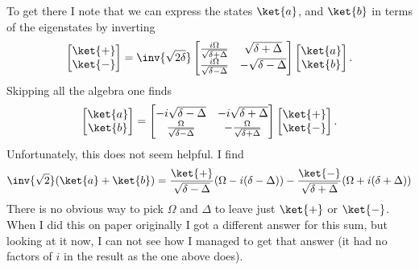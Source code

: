 {To get there I note that we can express the states \(\ket{a}\), and \(\ket{b}\) in terms of the eigenstates by inverting
%
\begin{equation}\label{eqn:qmIexamPractice2008Dec:2:150}
\begin{bmatrix}
\ket{+} \\
\ket{-} \\
\end{bmatrix}
=\inv{\sqrt{2\delta}}
\begin{bmatrix}
\frac{i \Omega}{\sqrt{\delta + \Delta}} & \sqrt{\delta + \Delta} \\
\frac{i \Omega}{\sqrt{\delta - \Delta}} & -\sqrt{\delta - \Delta}
\end{bmatrix}
\begin{bmatrix}
\ket{a} \\
\ket{b} \\
\end{bmatrix}.
\end{equation}
%
Skipping all the algebra one finds
%
\begin{equation}\label{eqn:qmIexamPractice2008Dec:2:160}
\begin{bmatrix}
\ket{a} \\
\ket{b} \\
\end{bmatrix}
=
\begin{bmatrix}
-i\sqrt{\delta - \Delta} & -i\sqrt{\delta + \Delta} \\
\frac{\Omega}{\sqrt{\delta - \Delta}} &
-\frac{\Omega}{\sqrt{\delta + \Delta}}
\end{bmatrix}
\begin{bmatrix}
\ket{+} \\
\ket{-} \\
\end{bmatrix}.
\end{equation}
%
Unfortunately, this does not seem helpful.  I find
%
\begin{equation}\label{eqn:qmIexamPractice2008Dec:2:170}
\inv{\sqrt{2}} ( \ket{a} + \ket{b} ) =
\frac{\ket{+}}{\sqrt{\delta - \Delta}}( \Omega - i (\delta - \Delta) )
-\frac{\ket{-}}{\sqrt{\delta + \Delta}}( \Omega + i (\delta + \Delta) )
\end{equation}
%
There is no obvious way to pick \(\Omega\) and \(\Delta\) to leave just \(\ket{+}\) or \(\ket{-}\).  When I did this on paper originally I got a different answer for this sum, but looking at it now, I can not see how I managed to get that answer (it had no factors of \(i\) in the result as the one above does).

}
